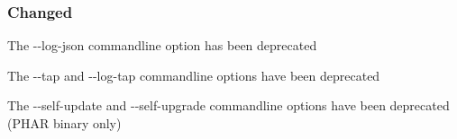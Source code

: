 \subsubsection*{Changed}


\begin{DoxyItemize}
\item The {\ttfamily -\/-\/log-\/json} commandline option has been deprecated
\item The {\ttfamily -\/-\/tap} and {\ttfamily -\/-\/log-\/tap} commandline options have been deprecated
\item The {\ttfamily -\/-\/self-\/update} and {\ttfamily -\/-\/self-\/upgrade} commandline options have been deprecated (P\+H\+AR binary only) 
\end{DoxyItemize}
